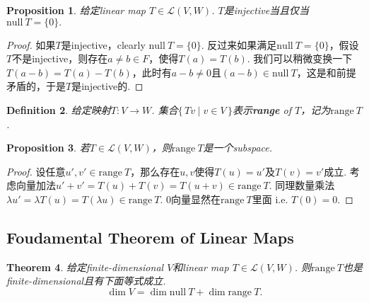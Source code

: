 \documentclass{article}
\newtheorem{theorem}{Theorem}[section]
\newtheorem{proposition}[theorem]{Proposition}
\newtheorem{definition}[theorem]{Definition}
\newcommand*{\xfunc}[4]{{#2}\colon{#3}{#1}{#4}}
\newcommand*{\func}[3]{\xfunc{\to}{#1}{#2}{#3}}
\newcommand\Set[2]{\{\,#1\mid#2\,\}} %
\newcommand\nul[1]{\text{null}\ #1}
\newcommand\range[1]{\text{range}\ #1}
\begin{document}
\begin{proposition}\label{lm: injective}
\rm 给定linear map $T \in \mathcal{L}(V,W)$. $T$是injective当且仅当$\nul{T}=\{0\}.$
\end{proposition}

\begin{proof}
如果$T$是injective，clearly $\nul{T}=\{0\}$. 反过来如果满足$\nul{T}=\{0\}$，假设$T$不是injective，则存在$a \neq b \in F$，使得$T(a) = T(b)$. 我们可以稍微变换一下$T(a-b) = T(a) - T(b)$，此时有$a-b \neq 0$且$(a - b) \in \nul{T}$，这是和前提矛盾的，于是$T$是injective的.
\end{proof}


\begin{definition}
\rm 给定映射$\func{T}{V}{W}$. 集合$\Set{Tv}{v \in V}$表示\textbf{range} of $T$，记为$\range{T}$.
\end{definition}

\begin{proposition}
\rm 若$T \in \mathcal{L}(V,W)$，则$\range{T}$是一个subspace.
\end{proposition}

\begin{proof}
设任意$u',v' \in \range{T}$，那么存在$u,v$使得$T(u) = u'$及$T(v) = v'$成立. 考虑向量加法$u' + v' = T(u) + T(v) = T(u+v) \in \range{T}$. 同理数量乘法$\lambda u' = \lambda T(u) = T(\lambda u) \in \range{T}$. $0$向量显然在$\range{T}$里面 i.e. $T(0) = 0$.
\end{proof}

\newpage
\subsection{Foudamental Theorem of Linear Maps}

\begin{theorem}\label{lm:basic}
\rm 给定finite-dimensional $V$和linear map $T \in \mathcal{L}(V,W)$. 则$\range{T}$也是finite-dimensional且有下面等式成立.
$$
\dim V  = \dim \nul{T} + \dim \range{T}.
$$

\end{theorem}
\end{document}
